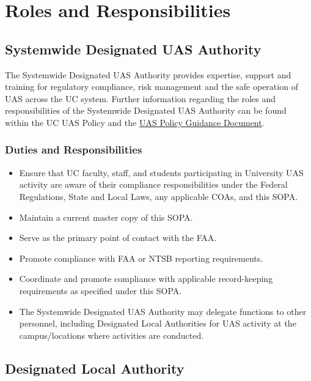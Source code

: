 \documentclass[
]{book}
\providecommand{\tightlist}{%
  \setlength{\itemsep}{0pt}\setlength{\parskip}{0pt}}
\begin{document}
\chapter{Roles and Responsibilities}\label{ch-roles-responsibilities}

\section{Systemwide Designated UAS Authority}\label{systemwide-designated-uas-authority}

The Systemwide Designated UAS Authority provides expertise, support and training for regulatory compliance, risk management and the safe operation of UAS across the UC system. Further information regarding the roles and responsibilities of the Systemwide Designated UAS Authority can be found within the UC UAS Policy and the \href{https://ucdrones.github.io/Policy_Guidance/}{UAS Policy Guidance Document}.

\subsection{Duties and Responsibilities}\label{duties-and-responsibilities}

\begin{itemize}
\tightlist
\item
  Ensure that UC faculty, staff, and students participating in University UAS activity are aware of their compliance responsibilities under the Federal Regulations, State and Local Laws, any applicable COAs, and this SOPA.
\item
  Maintain a current master copy of this SOPA.
\item
  Serve as the primary point of contact with the FAA.
\item
  Promote compliance with FAA or NTSB reporting requirements.
\item
  Coordinate and promote compliance with applicable record-keeping requirements as specified under this SOPA.
\item
  The Systemwide Designated UAS Authority may delegate functions to other personnel, including Designated Local Authorities for UAS activity at the campus/locations where activities are conducted.
\end{itemize}

\section{Designated Local Authority}\label{designated-local-authority}
\end{document}
